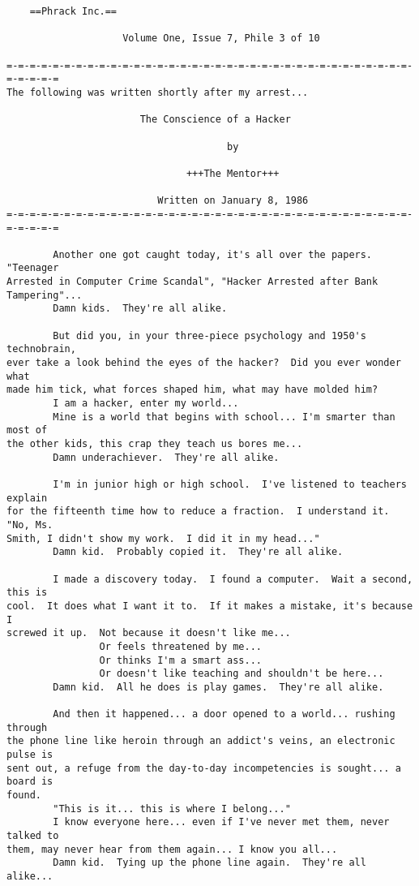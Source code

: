 \fontsize{7}{8.4}
\begin{center}
\begin{varwidth}{\textwidth}
\begin{verbatim}
    ==Phrack Inc.==

                    Volume One, Issue 7, Phile 3 of 10

=-=-=-=-=-=-=-=-=-=-=-=-=-=-=-=-=-=-=-=-=-=-=-=-=-=-=-=-=-=-=-=-=-=-=-=-=-=-=-=
The following was written shortly after my arrest...

                       The Conscience of a Hacker

                                      by

                               +++The Mentor+++

                          Written on January 8, 1986
=-=-=-=-=-=-=-=-=-=-=-=-=-=-=-=-=-=-=-=-=-=-=-=-=-=-=-=-=-=-=-=-=-=-=-=-=-=-=-=

        Another one got caught today, it's all over the papers.  "Teenager
Arrested in Computer Crime Scandal", "Hacker Arrested after Bank Tampering"...
        Damn kids.  They're all alike.

        But did you, in your three-piece psychology and 1950's technobrain,
ever take a look behind the eyes of the hacker?  Did you ever wonder what
made him tick, what forces shaped him, what may have molded him?
        I am a hacker, enter my world...
        Mine is a world that begins with school... I'm smarter than most of
the other kids, this crap they teach us bores me...
        Damn underachiever.  They're all alike.

        I'm in junior high or high school.  I've listened to teachers explain
for the fifteenth time how to reduce a fraction.  I understand it.  "No, Ms.
Smith, I didn't show my work.  I did it in my head..."
        Damn kid.  Probably copied it.  They're all alike.

        I made a discovery today.  I found a computer.  Wait a second, this is
cool.  It does what I want it to.  If it makes a mistake, it's because I
screwed it up.  Not because it doesn't like me...
                Or feels threatened by me...
                Or thinks I'm a smart ass...
                Or doesn't like teaching and shouldn't be here...
        Damn kid.  All he does is play games.  They're all alike.

        And then it happened... a door opened to a world... rushing through
the phone line like heroin through an addict's veins, an electronic pulse is
sent out, a refuge from the day-to-day incompetencies is sought... a board is
found.
        "This is it... this is where I belong..."
        I know everyone here... even if I've never met them, never talked to
them, may never hear from them again... I know you all...
        Damn kid.  Tying up the phone line again.  They're all alike...


\end{verbatim}
\end{varwidth}
\end{center}
